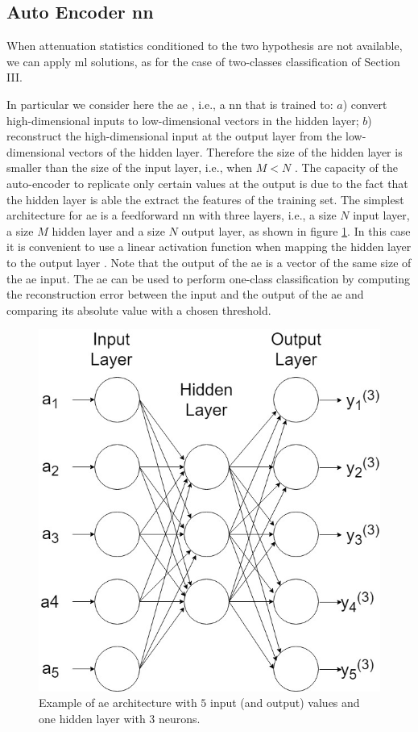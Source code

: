 \documentclass[draftcls,onecolumn,12pt]{IEEEtran}
\begin{document}
\subsection{Auto Encoder \ac{nn}}
\label{sec:auto}

When attenuation statistics conditioned to the two hypothesis are not available, we can apply \ac{ml} solutions, as for the case of two-classes classification of Section III. 

In particular we consider here the \ac{ae} \cite{Hinton-2006}, i.e., a \ac{nn} that is trained to: $a$) convert high-dimensional inputs to low-dimensional vectors in the hidden layer; $b$) reconstruct the high-dimensional input at the output layer from the low-dimensional vectors of the hidden layer. Therefore the size of the hidden layer is smaller than the size of the input layer, i.e., when $M<N$ \cite{Bourlard-88}. The capacity of the auto-encoder to replicate only certain values at the output is due to the fact that the hidden layer is able the extract the features of the training set. The simplest architecture for \ac{ae} is a feedforward \ac{nn} with three layers, i.e., a size $N$ input layer, a size $M$ hidden layer and a size $N$ output layer, as shown in figure \ref{fig:aeArch}. In this case it is convenient to use a linear activation function when mapping the hidden layer to the output layer \cite{goodfellow}. Note that the output of the \ac{ae} is a vector of the same size of the \ac{ae} input. The \ac{ae} can be used to perform one-class classification by computing the reconstruction error between the input and the output of the \ac{ae} and comparing its absolute value with a chosen threshold.

\begin{figure}[t]
    \centering
    \includegraphics[width=0.5\columnwidth]{AE.jpg}
    \caption{Example of \ac{ae} architecture with $5$ input (and output) values and one hidden layer with 3 neurons.} 
    \label{fig:aeArch}
\end{figure}
\end{document}
